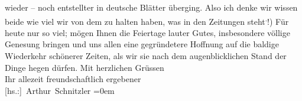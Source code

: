                     wieder \introOben{}–\introOben{} noch entstellter in deutsche Blätter
                    überging. Also ich denke wir wissen beide wie viel wir von dem zu halten haben,
                    was in den Zeitungen steht\substVorne{}\textsuperscript{.}\substDazwischen{}!\substHinten{}\introOben{})\introOben{}\pend
           \pstart
           Für heute nur so viel; mögen Ihnen die Feiertage lauter Gutes, insbesondere
                    völlige Genesung bringen und uns allen eine gegründetere Hoffnung auf die
                    baldige Wiederkehr schönerer Zeiten, als wir sie nach dem augenblicklichen Stand
                    der Dinge hegen dürfen.\pend
           \pstart
           Mit herzlichen Grüssen{\\[\baselineskip]}Ihr allezeit freundschaftlich ergebener{\\[\baselineskip]}\spacefill\mbox{{[}hs.:{]} Arthur Schnitzler}\pend
           \leftskip=0em{}\endnumbering{}  
      